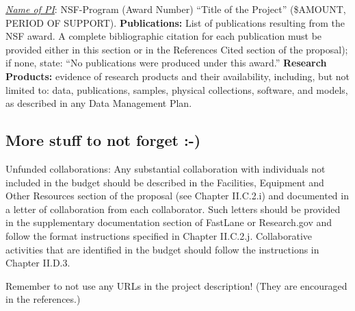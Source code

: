 \noindent
\emph{\underline{Name of PI}}: NSF-Program (Award Number) ``Title of the Project'' (\$AMOUNT, PERIOD OF SUPPORT).
{\bf Publications:} List of publications resulting from the NSF award. A complete bibliographic citation for each
publication must be provided either in this section or in the References Cited section of the proposal); if
none, state: ``No publications were produced under this award.'' {\bf Research Products:} evidence of research products
and their availability, including, but not limited to: data, publications, samples, physical collections, software,
and models, as described in any Data Management Plan.

%

\subsection{More stuff to not forget :-)}

Unfunded collaborations: Any substantial collaboration with individuals not included in the budget should be described in the Facilities, Equipment and Other Resources section of the proposal (see Chapter II.C.2.i) and documented in a letter of collaboration from each collaborator. Such letters should be provided in the supplementary documentation section of FastLane or Research.gov and follow the format instructions specified in Chapter II.C.2.j. Collaborative activities that are identified in the budget should follow the instructions in Chapter II.D.3.

Remember to not use any URLs in the project description!  (They are
encouraged in the references.)
